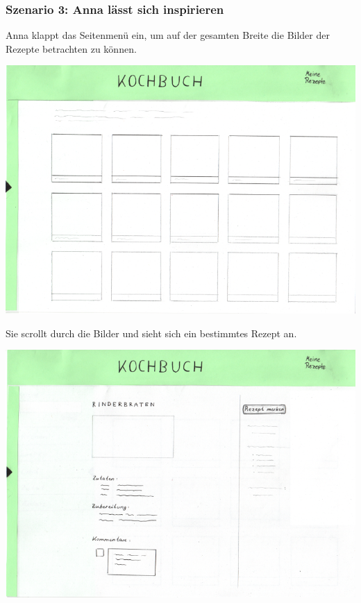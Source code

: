 \documentclass[parskip,10pt,abstracton]{scrartcl}
\begin{document}
\pagebreak
\subsubsection*{Szenario 3: Anna lässt sich inspirieren}

Anna klappt das Seitenmenü ein, um auf der gesamten Breite die Bilder der Rezepte betrachten zu können.
\begin{center}
\includegraphics[scale=0.4]{Prototyp/home_menuhidden.png}
\end{center}

Sie scrollt durch die Bilder und sieht sich ein bestimmtes Rezept an.
\begin{center}
\includegraphics[scale=0.4]{Prototyp/rezeptseite_menuhidden.png}
\end{center}
\end{document}
